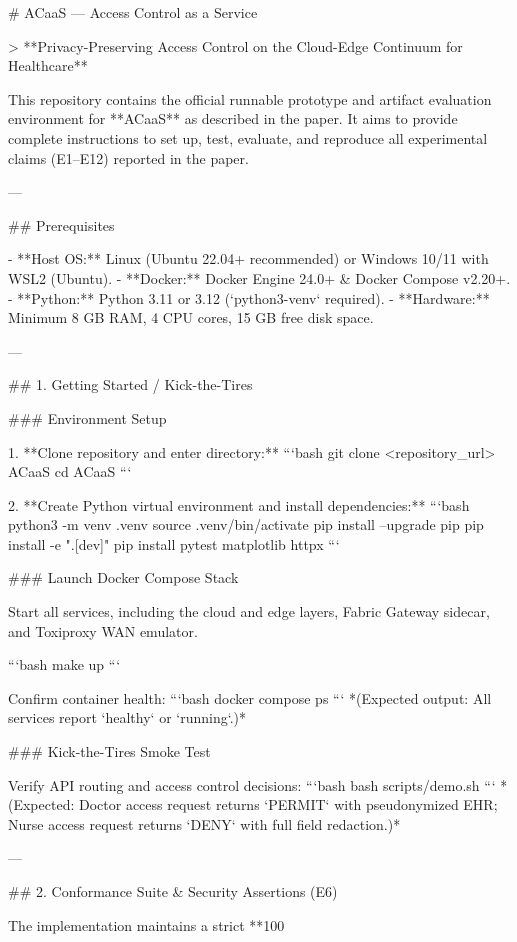 # ACaaS — Access Control as a Service

> **Privacy-Preserving Access Control on the Cloud-Edge Continuum for Healthcare**

This repository contains the official runnable prototype and artifact evaluation environment for **ACaaS** as described in the paper. It aims to provide complete instructions to set up, test, evaluate, and reproduce all experimental claims (E1–E12) reported in the paper.

---

## Prerequisites

- **Host OS:** Linux (Ubuntu 22.04+ recommended) or Windows 10/11 with WSL2 (Ubuntu).
- **Docker:** Docker Engine 24.0+ & Docker Compose v2.20+.
- **Python:** Python 3.11 or 3.12 (`python3-venv` required).
- **Hardware:** Minimum 8 GB RAM, 4 CPU cores, 15 GB free disk space.

---

## 1. Getting Started / Kick-the-Tires

### Environment Setup

1. **Clone repository and enter directory:**
   ```bash
   git clone <repository_url> ACaaS
   cd ACaaS
   ```

2. **Create Python virtual environment and install dependencies:**
   ```bash
   python3 -m venv .venv
   source .venv/bin/activate
   pip install --upgrade pip
   pip install -e ".[dev]"
   pip install pytest matplotlib httpx
   ```

### Launch Docker Compose Stack

Start all services, including the cloud and edge layers, Fabric Gateway sidecar, and Toxiproxy WAN emulator.

```bash
make up
```

Confirm container health:
```bash
docker compose ps
```
*(Expected output: All services report `healthy` or `running`.)*

### Kick-the-Tires Smoke Test

Verify API routing and access control decisions:
```bash
bash scripts/demo.sh
```
*(Expected: Doctor access request returns `PERMIT` with pseudonymized EHR; Nurse access request returns `DENY` with full field redaction.)*

---

## 2. Conformance Suite & Security Assertions (E6)

The implementation maintains a strict **100%

